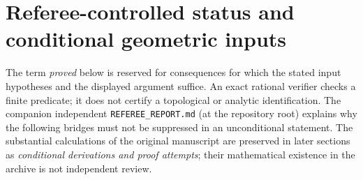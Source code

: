 \section{Referee-controlled status and conditional geometric inputs}\label{sec:status}

The term \emph{proved} below is reserved for consequences for which the
stated input hypotheses and the displayed argument suffice.  An exact
rational verifier checks a finite predicate; it does not certify a
topological or analytic identification.  The companion independent
\texttt{REFEREE\_REPORT.md} (at the repository root) explains why the
following bridges must not be suppressed in an unconditional statement.
The substantial calculations of the original manuscript are preserved
in later sections as \emph{conditional derivations and proof attempts};
their mathematical existence in the archive is not independent review.


